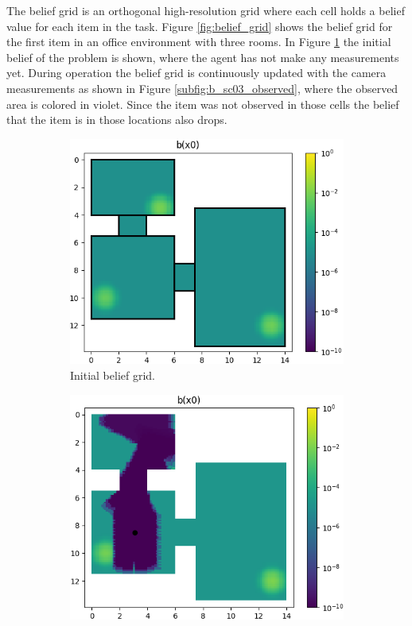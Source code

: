 The belief grid is an orthogonal high-resolution grid where each cell holds a belief value for each item in the task. Figure \ref{fig:belief_grid} shows the belief grid for the first item in an office environment with three rooms. In Figure \ref{subfig:b_sc03} the initial belief of the problem is shown, where the agent has not make any measurements yet. During operation the belief grid is continuously updated with the camera measurements as shown in Figure \ref{subfig:b_sc03_observed}, where the observed area is colored in violet. Since the item was not observed in those cells the belief that the item is in those locations also drops.\\

%
\begin{figure}[h]
    \centering
    \begin{subfigure}[t]{0.48\textwidth}
        \includegraphics[width=\textwidth]{Report/images/belief_sc03.png}
        \caption{Initial belief grid.}
        \label{subfig:b_sc03}
    \end{subfigure}
    \hfill
    \begin{subfigure}[t]{0.48\textwidth}
        \includegraphics[width=\textwidth]{Report/images/belief_sc03_observed.png}

\end{subfigure}
\end{figure}
